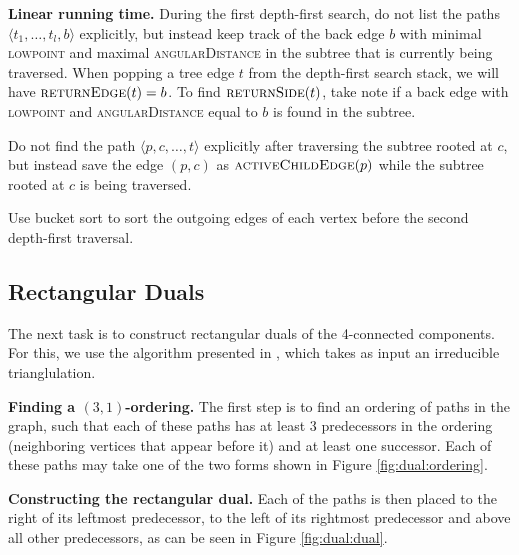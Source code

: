 \documentclass[a4paper]{article}
\begin{document}
\medskip\noindent
\textbf{Linear running time.}
During the first depth-first search, do not list the paths $\langle t_1, \dots,
t_l, b \rangle$ explicitly, but instead keep track of the back edge $b$ with
minimal \textsc{lowpoint} and maximal \textsc{angularDistance} in the subtree
that is currently being traversed.
When popping a tree edge $t$ from the depth-first search stack, we will have
$\textsc{returnEdge}(t) = b$.
To find $\textsc{returnSide}(t)$, take note if a back edge with
\textsc{lowpoint} and \textsc{angularDistance} equal to $b$ is found in the
subtree.

Do not find the path $\langle p, c, \dots, t \rangle$ explicitly after
traversing the subtree rooted at $c$, but instead
save the edge $(p,c)$ as $\textsc{activeChildEdge}(p)$ while the subtree rooted
at $c$ is being traversed.

Use bucket sort to sort the outgoing edges of
each vertex before the second depth-first traversal.

\subsection{Rectangular Duals}
The next task is to construct rectangular duals of the 4-connected components.
For this, we use the algorithm presented in \citet{dual}, which takes as input
an irreducible trianglulation.

\medskip\noindent
\textbf{Finding a $(3,1)$-ordering.}
The first step is to find an ordering of paths in the graph, such that each of
these paths has at least $3$ predecessors in the ordering (neighboring vertices
that appear before it) and at least one successor.
Each of these paths may take one of the two forms shown in Figure
\ref{fig:dual:ordering}.

\medskip\noindent
\textbf{Constructing the rectangular dual.}
Each of the paths is then placed to the right of its leftmost predecessor, to
the left of its rightmost predecessor and above all other predecessors, as can
be seen in Figure \ref{fig:dual:dual}.
\end{document}
